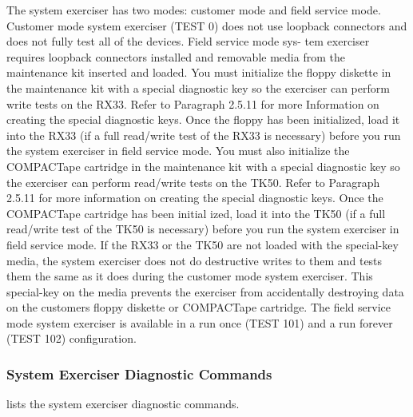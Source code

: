 The system exerciser has two modes: customer mode and field service
mode. Customer mode system exerciser (TEST 0) does not use loopback
connectors and does not fully test all of the devices. Field service mode sys-
tem exerciser requires loopback connectors installed and removable media
from the maintenance kit inserted and loaded. You must initialize the floppy
diskette in the maintenance kit with a special diagnostic key so the exerciser
can perform write tests on the RX33. Refer to Paragraph 2.5.11 for more
Information on creating the special diagnostic keys. Once the floppy has
been initialized, load it into the RX33 (if a full read/write test of the RX33 is
necessary) before you run the system exerciser in field service mode. You
must also initialize the COMPACTape cartridge in the maintenance kit with
a special diagnostic key so the exerciser can perform read/write tests on
the TK50. Refer to Paragraph 2.5.11 for more information on creating the
special diagnostic keys. Once the COMPACTape cartridge has been initial
ized, load it into the TK50 (if a full read/write test of the TK50 is necessary)
before you run the system exerciser in field service mode. If the RX33 or
the TK50 are not loaded with the special-key media, the system exerciser
does not do destructive writes to them and tests them the same as it does
during the customer mode system exerciser. This special-key on the media
prevents the exerciser from accidentally destroying data on the customers
floppy diskette or COMPACTape cartridge. The field service mode system
exerciser is available in a run once (TEST 101) and a run forever (TEST 102)
configuration.

\newpage

\subsubsection{System Exerciser Diagnostic Commands}
 lists the system exerciser diagnostic commands.

